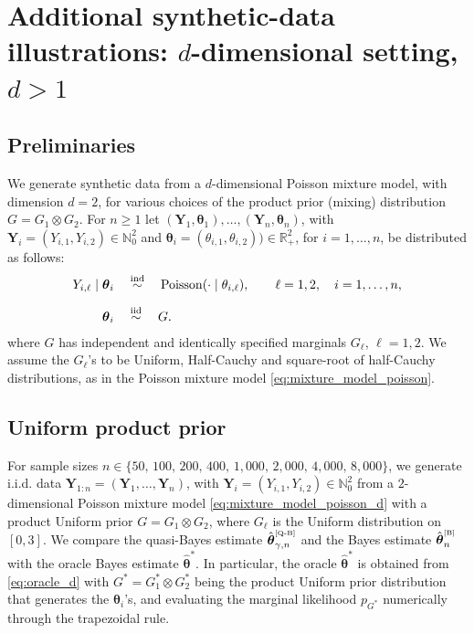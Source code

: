 \documentclass[twoside,12pt]{article}
\def\simind{\stackrel{\mbox{\scriptsize{ind}}}{\sim}}
\def\simiid{\stackrel{\mbox{\scriptsize{iid}}}{\sim}}
\begin{document}
\section{Additional synthetic-data illustrations: $d$-dimensional setting, $d>1$}\label{app4}

\subsection{Preliminaries}

We generate synthetic data from a $d$-dimensional Poisson mixture model, with dimension $d=2$, for various choices of the product prior (mixing) distribution $G=G_{1}\otimes G_{2}$. For $n\geq1$ let  $(\boldsymbol Y_1,\boldsymbol\theta_1),\ldots,(\boldsymbol Y_n,\boldsymbol\theta_n)$, with $\boldsymbol Y_i =(Y_{i,1},Y_{i,2}) \in\mathbb N_0^2$ and $\boldsymbol{\theta}_{i}=(\theta_{i,1},\theta_{i,2}))\in\mathbb{R}_{+}^{2}$, for $i=1,\ldots,n$, be distributed as follows:
\begin{equation}\label{eq:mixture_model_poisson_d}
\begin{aligned}
Y_{i,\ell}\mid \boldsymbol\theta_i
&\quad \simind \quad
\operatorname{Poisson}(\cdot\mid \theta_{i,\ell}),
\qquad \ell=1,2,\quad i=1,\ldots,n,\\[0.2cm]
\boldsymbol\theta_i
&\quad \simiid \quad G.
\end{aligned}
\end{equation}
where $G$ has independent and identically specified marginals $G_{\ell}$, $\ell=1,2$. We assume the $G_{\ell}$'s to be Uniform, Half-Cauchy and square-root of half-Cauchy distributions, as in the Poisson mixture model \eqref{eq:mixture_model_poisson}.


\subsection{Uniform product prior}

For sample sizes $n\in\{50,\,100,\,200,\,400,\,1,000,\,2,000,\,4,000,\,8,000\}$, we generate i.i.d. data $\boldsymbol Y_{1:n}=(\boldsymbol Y_1,\ldots,\boldsymbol Y_n)$, with $\boldsymbol Y_i=(Y_{i,1},Y_{i,2})\in\mathbb N_0^2$ from a $2$-dimensional Poisson mixture model \eqref{eq:mixture_model_poisson_d} with a product Uniform prior $G=G_1\otimes G_2$,  where $G_{\ell}$ is the Uniform distribution on $[0,3]$. We compare the quasi-Bayes estimate $\hat{\boldsymbol{\theta}}^{\text{\tiny{[Q-B]}}}_{\gamma,n}$ and the Bayes estimate $\hat{\boldsymbol{\theta}}^{\text{\tiny{[B]}}}_{n}$ with the oracle Bayes estimate $\hat{\boldsymbol{\theta}}^{\ast}$. In particular, the oracle $\hat{\boldsymbol{\theta}}^{\ast}$ is obtained from \eqref{eq:oracle_d} with $G^{\ast}=G_1^{\ast}\otimes G_2^{\ast}$ being the product Uniform prior distribution that generates the $\boldsymbol{\theta}_{i}$'s, and evaluating the marginal likelihood $p_{G^\ast}$ numerically through the trapezoidal rule.
\end{document}
